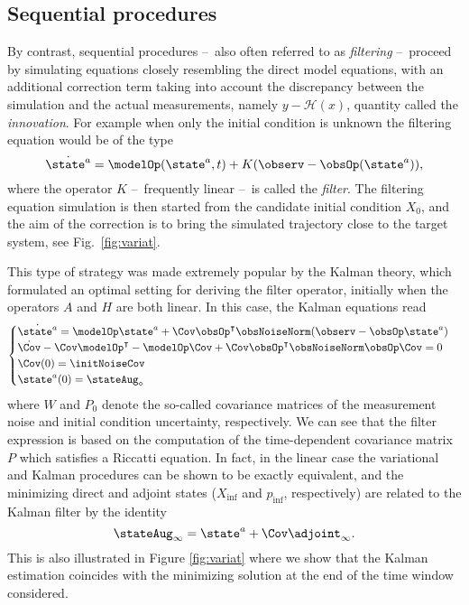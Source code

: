 \documentclass{tufte-book}
\begin{document}
\subsection{Sequential procedures}

By contrast, sequential procedures --~also often referred to as \emph{filtering} --~proceed by simulating equations closely resembling the direct model equations, with an additional correction term taking into account the discrepancy between the simulation and the actual measurements, namely $y-\mathcal{H}(x)$, quantity called the \emph{innovation}. For example when only the initial condition is unknown the filtering equation would be of the type
\begin{equation}\label{eq:filterNotation}
	\dot{\state^a} = \modelOp(\state^a,t) + K(\observ-\obsOp(\state^a)),
\end{equation}
where the operator $K$ --~frequently linear --~is called the \emph{filter}. The filtering equation simulation is then started from the candidate initial condition $X_0$, and the aim of the correction is to bring the simulated trajectory close to the target system, see Fig.~\ref{fig:variat}.

This type of strategy was made extremely popular by the Kalman theory, which formulated an optimal setting for deriving the filter operator, initially when the operators $A$ and $H$ are both linear. In this case, the Kalman equations read
\begin{equation}\label{eq:Kalman}
	\begin{cases}
		\dot{\state^a} = \modelOp\state^a + \Cov\obsOp^\intercal \obsNoiseNorm (\observ-\obsOp\state^a)\\
		\dot{\Cov} - \Cov\modelOp^\intercal - \modelOp\Cov + \Cov\obsOp^\intercal \obsNoiseNorm \obsOp\Cov = 0\\
		\Cov(0)=\initNoiseCov\\
		\state^a(0) = \stateAug_\diamond
	\end{cases}
\end{equation}
where $W$ and $P_0$ denote the  so-called covariance matrices of the measurement noise and initial condition uncertainty, respectively. We can see that the filter expression is based on the computation of the time-dependent covariance matrix $P$ which satisfies a Riccatti equation. In fact, in the linear case the variational and Kalman procedures can be shown to be exactly equivalent, and the minimizing direct and adjoint states ($X_\text{inf}$ and $p_\text{inf}$, respectively) are related to the Kalman filter by the identity \cite{Bensoussan71}
\[
	\stateAug_\infty = \state^a + \Cov \adjoint_\infty.
\]
This is also illustrated in Figure \ref{fig:variat} where we show that the Kalman estimation coincides with the minimizing solution at the end of the time window considered.
\end{document}
